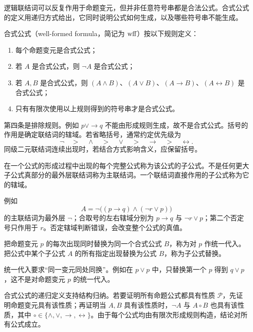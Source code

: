 逻辑联结词可以反复作用于命题变元，但并非任意符号串都是合法公式。合式公式的定义用递归方式给出，它同时说明公式如何生成，以及哪些符号串不能生成。

\begin{definition}[合式公式]\label{ch1-wff}
合式公式（well-formed formula，简记为 $\mathrm{wff}$）按以下规则定义：
\begin{enumerate}
  \item 每个命题变元是合式公式；
  \item 若 $A$ 是合式公式，则 $\neg A$ 是合式公式；
  \item 若 $A,B$ 是合式公式，则 $(A\land B)$、$(A\lor B)$、$(A\to B)$、$(A\leftrightarrow B)$ 是合式公式；
  \item 只有有限次使用以上规则得到的符号串才是合式公式。
\end{enumerate}
\end{definition}

第四条是排除规则。例如 $p\lor\to q$ 不能由形成规则生成，故不是合式公式。括号的作用是确定联结词的辖域。若省略括号，通常约定优先级为
\[
  \neg\quad >\quad \land\quad >\quad \lor\quad >\quad \to\quad >\quad \leftrightarrow .
\]
同级二元联结词连续出现时，若结合方式影响含义，应保留括号。

\begin{definition}\label{ch1-subformula}
在一个公式的形成过程中出现的每个完整公式称为该公式的子公式。不是任何更大子公式真部分的最外层联结词称为主联结词。一个联结词直接作用的子公式称为它的辖域。
\end{definition}

例如
\[
  A=\neg\bigl((p\to q)\land(\neg r\lor p)\bigr)
\]
的主联结词为最外层 $\neg$；合取号的左右辖域分别为 $p\to q$ 与 $\neg r\lor p$；第二个否定号只作用于 $r$。否定辖域判断错误，会改变整个公式的真值。

\begin{definition}[代入与替换]\label{ch1-substitution}
把命题变元 $p$ 的每次出现同时替换为同一个合式公式 $B$，称为对 $p$ 作统一代入。把公式中某个子公式 $A$ 的所有指定出现替换为公式 $B$，称为子公式替换。
\end{definition}

统一代入要求“同一变元同处同换”。例如在 $p\lor p$ 中，只替换第一个 $p$ 得到 $q\lor p$，这不是对命题变元 $p$ 的统一代入。

合式公式的递归定义支持结构归纳。若要证明所有命题公式都具有性质 $\mathcal P$，先证明命题变元具有该性质；再证明当 $A,B$ 具有该性质时，$\neg A$ 与 $A\circ B$ 也具有该性质，其中 $\circ\in\{\land,\lor,\to,\leftrightarrow\}$。由于每个公式均由有限次形成规则构造，结论对所有公式成立。

